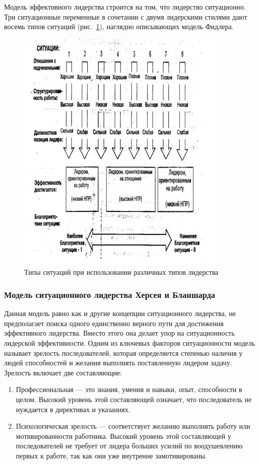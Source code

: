 \documentclass[a4paper,12pt,oneside,final]{extarticle}
\makeatletter
\numberwithin{equation}{section}
\def\maxwidth#1{\ifdim\Gin@nat@width>#1 #1\else\Gin@nat@width\fi}
\makeatother
\begin{document}
Модель эффективного лидерства строится на том, что лидерство ситуационно. 
Три ситуационные переменные в сочетании с двумя лидерскими стилями дают восемь типов ситуаций (рис.~\ref{leadership_fd}), наглядно описывающих модель Фидлера.

\begin{figure}[h]
	\centering
	\includegraphics[width=\maxwidth{\textwidth}]{management-figures/leadership_fd}
	\caption{Типы ситуаций при использовании различных типов лидерства}
	\label{leadership_fd}
\end{figure}

\subsubsection{Модель ситуационного лидерства Херсея и Бланшарда}
Данная модель равно как и другие концепции ситуационного лидерства, не предполагает поиска одного единственно верного пути для достижения эффективного лидерства. 
Вместо этого она делает упор на ситуационность лидерской эффективности. 
Одним из ключевых факторов ситуационности модель называет зрелость последователей, которая определяется степенью наличия у людей способностей и желания выполнять поставленную лидером задачу. 
Зрелость включает две составляющие: 
\begin{enumerate}
	\item Профессиональная --- это знания, умения и навыки, опыт, способности в целом. 
	Высокий уровень этой составляющей означает, что последователь не нуждается в директивах и указаниях.
	\item Психологическая зрелость --- соответствует желанию выполнять работу или мотивированности работника. 
	Высокий уровень этой составляющей у последователей не требует от лидера больших усилий по воодушевлению первых к работе, так как они уже внутренне замотивированы.
\end{enumerate}
\end{document}
